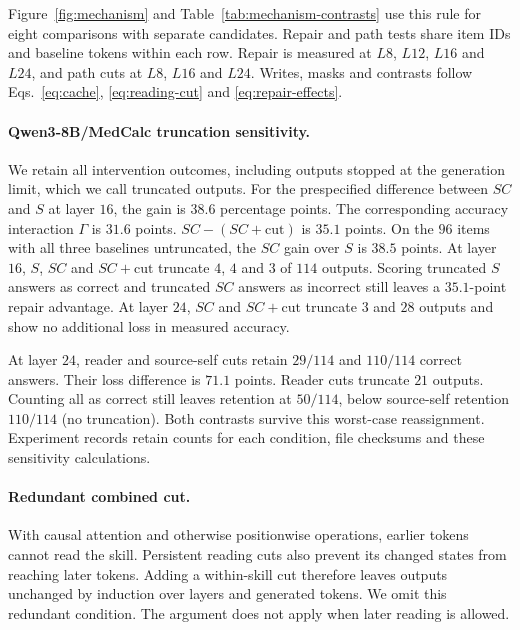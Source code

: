 Figure~\ref{fig:mechanism} and Table~\ref{tab:mechanism-contrasts} use this
rule for eight comparisons with separate candidates. Repair and path tests
share item IDs and baseline tokens within each row. Repair is measured
at $L8$, $L12$, $L16$ and $L24$, and path cuts at $L8$, $L16$ and $L24$.
Writes, masks and contrasts follow
Eqs.~\eqref{eq:cache}, \eqref{eq:reading-cut} and \eqref{eq:repair-effects}.

\paragraph{Qwen3-8B/MedCalc truncation sensitivity.}
We retain all intervention outcomes, including outputs stopped at the
generation limit, which we call truncated outputs. For the
prespecified difference between $SC$ and $S$ at layer $16$, the gain is $38.6$ percentage
points.
The corresponding accuracy interaction $\Gamma$ is $31.6$ points. $SC-(SC+\mathrm{cut})$ is $35.1$ points.
On the $96$ items with all three baselines untruncated, the $SC$ gain over $S$ is
$38.5$ points.
At layer $16$, $S$, $SC$ and $SC+\mathrm{cut}$ truncate $4$, $4$ and $3$ of $114$ outputs.
Scoring truncated $S$ answers as correct and truncated $SC$ answers as
incorrect still leaves a
$35.1$-point repair advantage. At layer $24$, $SC$ and $SC+\mathrm{cut}$ truncate $3$ and $28$
outputs and show no additional loss in measured accuracy.

At layer $24$, reader and source-self cuts retain $29/114$ and $110/114$
correct answers. Their loss difference is $71.1$ points.
Reader cuts truncate $21$ outputs. Counting all as correct still leaves
retention at $50/114$, below source-self retention $110/114$ (no truncation).
Both contrasts survive this worst-case reassignment. Experiment records retain counts for each condition, file checksums
and these sensitivity calculations.

\paragraph{Redundant combined cut.}
With causal attention and otherwise positionwise operations, earlier
tokens cannot read the skill. Persistent reading cuts also prevent its
changed states from reaching later tokens. Adding a within-skill cut
therefore leaves outputs unchanged by induction over layers and generated
tokens. We omit this redundant condition. The argument does not apply
when later reading is allowed.


